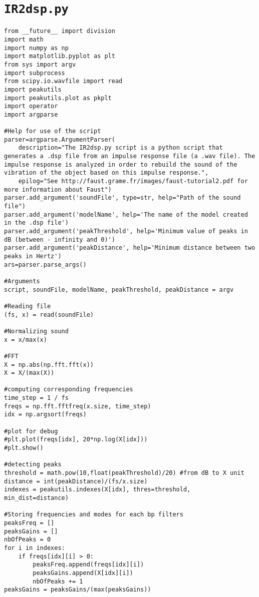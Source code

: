 \chapter{\texttt{IR2dsp.py}}
\lstset{language=Python}

\begin{lstlisting}
from __future__ import division
import math
import numpy as np
import matplotlib.pyplot as plt
from sys import argv
import subprocess
from scipy.io.wavfile import read
import peakutils
import peakutils.plot as pkplt
import operator
import argparse

#Help for use of the script
parser=argparse.ArgumentParser(
    description="The IR2dsp.py script is a python script that generates a .dsp file from an impulse response file (a .wav file). The impulse response is analyzed in order to rebuild the sound of the vibration of the object based on this impulse response.",
    epilog="See http://faust.grame.fr/images/faust-tutorial2.pdf for more information about Faust")
parser.add_argument('soundFile', type=str, help="Path of the sound file")
parser.add_argument('modelName', help='The name of the model created in the .dsp file')
parser.add_argument('peakThreshold', help='Minimum value of peaks in dB (between - infinity and 0)')
parser.add_argument('peakDistance', help='Minimum distance between two peaks in Hertz')
ars=parser.parse_args()

#Arguments
script, soundFile, modelName, peakThreshold, peakDistance = argv

#Reading file
(fs, x) = read(soundFile)

#Normalizing sound
x = x/max(x)

#FFT
X = np.abs(np.fft.fft(x))
X = X/(max(X))

#computing corresponding frequencies
time_step = 1 / fs
freqs = np.fft.fftfreq(x.size, time_step) 
idx = np.argsort(freqs)

#plot for debug
#plt.plot(freqs[idx], 20*np.log(X[idx]))
#plt.show()

#detecting peaks
threshold = math.pow(10,float(peakThreshold)/20) #from dB to X unit
distance = int(peakDistance)/(fs/x.size)
indexes = peakutils.indexes(X[idx], thres=threshold, min_dist=distance)

#Storing frequencies and modes for each bp filters
peaksFreq = []
peaksGains = []
nbOfPeaks = 0
for i in indexes:
    if freqs[idx][i] > 0:
        peaksFreq.append(freqs[idx][i])
        peaksGains.append(X[idx][i])
        nbOfPeaks += 1
peaksGains = peaksGains/(max(peaksGains))


\end{lstlisting}
